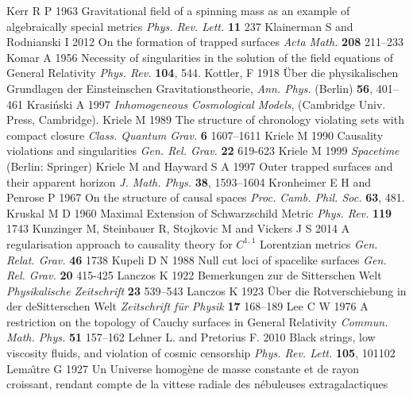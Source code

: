 \documentclass[12pt]{iopart}
\begin{document}
\begin{thebibliography}{999}
 Kerr R P 1963 Gravitational field of a spinning mass as an example of algebraically special metrics {\it Phys. Rev. Lett.} {\bf 11} 237
 Klainerman S and Rodnianski I 2012 On the formation of trapped surfaces {\it Acta Math.} {\bf 208} 211--233
 Komar A 1956 Necessity of singularities in the solution of the field equations of General Relativity {\it Phys. Rev.} {\bf 104}, 544.%
 Kottler, F 1918 \"Uber die physikalischen Grundlagen der Einsteinschen Gravitationstheorie, {\it Ann. Phys.} (Berlin) {\bf 56}, 401--461
 Krasi\'{n}ski A 1997 {\it Inhomogeneous Cosmological Models}, 
(Cambridge Univ. Press, Cambridge).
 Kriele M 1989 The structure of chronology violating sets with compact closure {\it Class. Quantum Grav.} {\bf 6} 1607--1611%
 Kriele M 1990 Causality violations and singularities {\it Gen. Rel. Grav.} {\bf 22} 619-623
 Kriele M 1999 {\it Spacetime} (Berlin: Springer)
 Kriele M and Hayward S A 1997 Outer trapped surfaces and their apparent horizon {\it J. Math. Phys.} {\bf 38}, 1593--1604%
 Kronheimer E H and Penrose P 1967 On the structure of causal spaces {\it Proc. Camb. Phil. Soc.}
{\bf 63}, 481.%
 Kruskal M D 1960 Maximal Extension of Schwarzschild Metric {\it Phys. Rev.} {\bf 119} 1743
 Kunzinger M, Steinbauer R,  Stojkovic M and Vickers J S 2014 A regularisation approach to causality theory for $C^{1,1}$ Lorentzian metrics {\it Gen. Relat. Grav.} {\bf 46} 1738
 Kupeli D N 1988 Null cut loci of spacelike surfaces {\it Gen. Rel. Grav.} {\bf 20} 415-425
 Lanczos  K 1922 Bemerkungen zur de Sitterschen Welt {\it Physikalische Zeitschrift} 
{\bf 23} 539--543%
 Lanczos K 1923 \"Uber die Rotverschiebung in der deSitterschen Welt {\it Zeitschrift f\"ur Physik} {\bf 
17} 168--189%
 Lee C W 1976 A restriction on the topology of Cauchy surfaces in General Relativity {\it Commun. Math. Phys.} {\bf 51} 157--162
 Lehner L. and Pretorius F. 2010 Black strings, low viscosity fluids, and violation of cosmic censorship {\it Phys. Rev. Lett.} {\bf 105}, 101102
 Lema\^{\i}tre G 1927 Un 
Universe homog\`ene de masse constante et de rayon croissant, rendant 
compte de la vittese radiale des n\'ebuleuses extragalactiques {\it 
}
\end{thebibliography}
\end{document}
